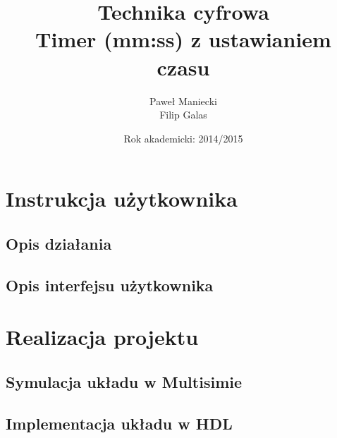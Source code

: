 \documentclass[a4paper,oneside]{report}
\title{
	\textbf{Technika cyfrowa}
	\\
	Timer (mm:ss) z ustawianiem czasu
	}
\author{
	Paweł Maniecki\\
	Filip Galas
	}
\date{Rok akademicki: 2014/2015}
\begin{document}
\maketitle

\tableofcontents

\chapter{Instrukcja użytkownika}
\section{Opis działania}
\section{Opis interfejsu użytkownika}

\chapter{Realizacja projektu}
\section{Symulacja układu w Multisimie}
\section{Implementacja układu w HDL}
\end{document}
